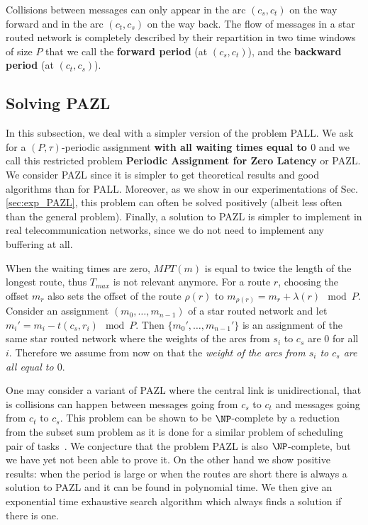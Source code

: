 \documentclass[10pt, conference, letterpaper]{IEEEtran}
\begin{document}
      
      Collisions between messages can only appear in the arc $(c_s,c_t)$ on the way forward and in the arc $(c_t,c_s)$ on the way back. The flow of messages in a star routed network is completely described by their repartition in two time windows of size $P$ that we call the {\bf forward period} (at $(c_s,c_t)$), and the {\bf backward period} (at $(c_t,c_s)$).


  \subsection{Solving PAZL}
  
  In this subsection, we deal with a simpler version of the problem PALL.
  We ask for a $(P,\tau)$-periodic assignment {\bf with all waiting times equal to $0$} and we call this restricted problem {\bf Periodic Assignment for Zero Latency} or PAZL. We consider PAZL since it is simpler to get theoretical results and good algorithms 
  than for PALL. Moreover, as we show in our experimentations of Sec.\ref{sec:exp_PAZL}, this problem can often be solved positively (albeit less often than the general problem). Finally, a solution to PAZL is simpler to implement in real telecommunication networks, since we do not need to implement any buffering at all.    
  
  When the waiting times are zero, $MPT(m)$ is equal to twice the length of the longest route, thus $T_{max}$ is not relevant anymore. For a route $r$, choosing the offset $m_r$ also sets the offset of the route $\rho(r)$ to $m_{\rho(r)} = m_{r} + \lambda(r) \mod P$.
  Consider an assignment $(m_0,\dots,m_{n-1})$ of a star routed network and let $m_i'= m_{i} - t(c_s,r_i) \mod P$.
  Then $\{m_0',\dots,m_{n-1}'\}$ is an assignment of the same star routed network where the weights of the arcs from $s_i$ to $c_s$ are $0$ for all $i$. Therefore we assume from now on that the \emph{weight of the arcs from $s_i$ to $c_s$ are all equal to $0$}.
  
  
  One may consider a variant of PAZL where the central link is unidirectional, that is collisions can happen between messages going from $c_s$ to $c_t$ and messages  going from $c_t$ to $c_s$. This problem can be shown to be $\NP$-complete by a reduction from the subset sum problem as it is done for a similar problem of scheduling pair of tasks~\cite{orman1997complexity}. We conjecture that the problem PAZL is also $\NP$-complete,  but we have yet not been able to prove it.
  On the other hand we show positive results:  when the period is large or when the routes are short there is always a solution to PAZL and it can be found in polynomial time. We then give an exponential time exhaustive search algorithm which always finds a solution if there is one. 
  
\end{document}
